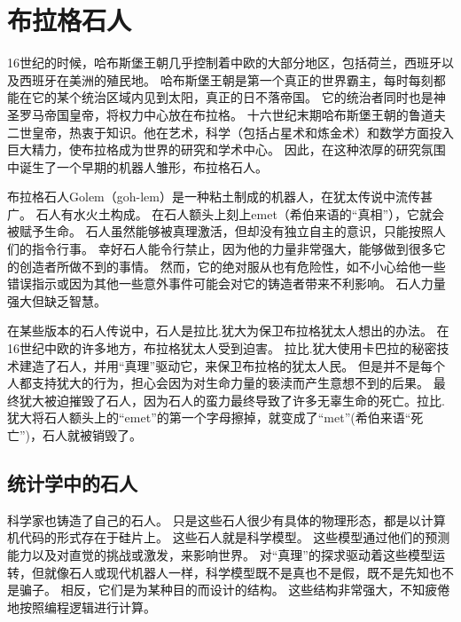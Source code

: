 
\chapter{布拉格石人}
16世纪的时候，哈布斯堡王朝几乎控制着中欧的大部分地区，包括荷兰，西班牙以及西班牙在美洲的殖民地。
哈布斯堡王朝是第一个真正的世界霸主，每时每刻都能在它的某个统治区域内见到太阳，真正的日不落帝国。
它的统治者同时也是神圣罗马帝国皇帝，将权力中心放在布拉格。
十六世纪末期哈布斯堡王朝的鲁道夫二世皇帝，热衷于知识。他在艺术，科学（包括占星术和炼金术）和数学方面投入巨大精力，使布拉格成为世界的研究和学术中心。
因此，在这种浓厚的研究氛围中诞生了一个早期的机器人雏形，布拉格石人。

布拉格石人Golem（goh-lem）是一种粘土制成的机器人，在犹太传说中流传甚广。
石人有水火土构成。
在石人额头上刻上emet（希伯来语的“真相”），它就会被赋予生命。
石人虽然能够被真理激活，但却没有独立自主的意识，只能按照人们的指令行事。
幸好石人能令行禁止，因为他的力量非常强大，能够做到很多它的创造者所做不到的事情。
然而，它的绝对服从也有危险性，如不小心给他一些错误指示或因为其他一些意外事件可能会对它的铸造者带来不利影响。
石人力量强大但缺乏智慧。


在某些版本的石人传说中，石人是拉比.犹大为保卫布拉格犹太人想出的办法。
在16世纪中欧的许多地方，布拉格犹太人受到迫害。
拉比.犹大使用卡巴拉的秘密技术建造了石人，并用“真理”驱动它，来保卫布拉格的犹太人民。
但是并不是每个人都支持犹大的行为，担心会因为对生命力量的亵渎而产生意想不到的后果。
最终犹大被迫摧毁了石人，因为石人的蛮力最终导致了许多无辜生命的死亡。拉比.犹大将石人额头上的“emet”的第一个字母擦掉，就变成了“met”(希伯来语“死亡”)，石人就被销毁了。

\section{统计学中的石人}
科学家也铸造了自己的石人。
只是这些石人很少有具体的物理形态，都是以计算机代码的形式存在于硅片上。
这些石人就是科学模型。
这些模型通过他们的预测能力以及对直觉的挑战或激发，来影响世界。
对“真理”的探求驱动着这些模型运转，但就像石人或现代机器人一样，科学模型既不是真也不是假，既不是先知也不是骗子。 
相反，它们是为某种目的而设计的结构。 这些结构非常强大，不知疲倦地按照编程逻辑进行计算。



